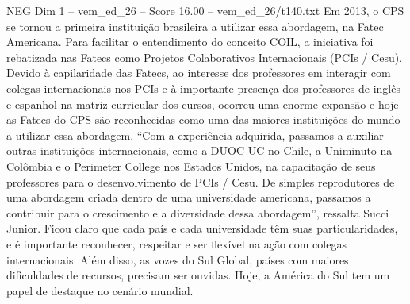 \begin{textsample}{NEG Dim 1 – vem\_ed\_26 – Score 16.00 – vem\_ed\_26/t140.txt}
Em 2013, o CPS se tornou a primeira instituição brasileira a utilizar essa abordagem, na Fatec Americana.
Para facilitar o entendimento do conceito COIL, a iniciativa foi rebatizada nas Fatecs como Projetos Colaborativos Internacionais (PCIs / Cesu).
Devido à capilaridade das Fatecs, ao interesse dos professores em interagir com colegas internacionais nos PCIs e à importante presença dos professores de inglês e espanhol na matriz curricular dos cursos, ocorreu uma enorme expansão e hoje as Fatecs do CPS são reconhecidas como uma das maiores instituições do mundo a utilizar essa abordagem. “Com a experiência adquirida, passamos a auxiliar outras instituições internacionais, como a DUOC UC no Chile, a Uniminuto na Colômbia e o Perimeter College nos Estados Unidos, na capacitação de seus professores para o desenvolvimento de PCIs / Cesu.
De simples reprodutores de uma abordagem criada dentro de uma universidade americana, passamos a contribuir para o crescimento e a diversidade dessa abordagem”, ressalta Succi Junior.
Ficou claro que cada país e cada universidade têm suas particularidades, e é importante reconhecer, respeitar e ser flexível na ação com colegas internacionais.
Além disso, as vozes do Sul Global, países com maiores dificuldades de recursos, precisam ser ouvidas.
Hoje, a América do Sul tem um papel de destaque no cenário mundial.

\end{textsample}

